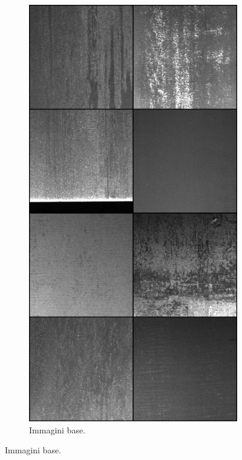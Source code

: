 \begin{figure}[htpb]
\begin{subfigure}[b]{0.3\textwidth}
        \includegraphics[width=\textwidth]{imgs/Coigan/results/buone/media_images_base_image_210000_e0ba01944dbb261374d3.png}
        \caption{Immagini base.}
        \label{fig:good_example_1}
    \end{subfigure}

\end{figure}
